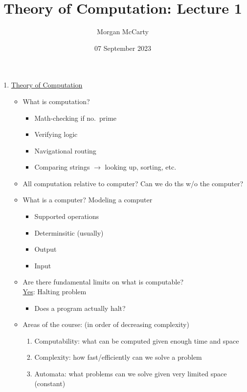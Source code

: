 \documentclass[12pt]{article}
\title{
    Theory of Computation: Lecture 1}
\author{Morgan McCarty}
\date{07 September 2023}
\begin{document}
    \maketitle

    \begin{enumerate}
        \item \underline{Theory of Computation}
        \begin{itemize}
            \item What is computation?
            \begin{itemize}
                \item Math-checking if no.\ prime
                \item Verifying logic
                \item Navigational routing
                \item Comparing strings $\rightarrow$ looking up, sorting, etc.\ 
            \end{itemize}
            \item All computation relative to computer? Can we do ths w/o the computer?
            \item What is a computer? Modeling a computer
            \begin{itemize}
                \item Supported operations
                \item Determinsitic (usually)
                \item Output
                \item Input
            \end{itemize}
            \item Are there fundamental limits on what is computable? \\
                \underline{Yes}: Halting problem
            \begin{itemize}
                \item Does a program actually halt?
            \end{itemize}
            \item Areas of the course: (in order of decreasing complexity)
            \begin{enumerate}
                \item Computability: what can be computed given enough time and space
                \item Complexity: how fast/efficiently can we solve a problem
                \item Automata: what problems can we solve given very limited space (constant)

\end{enumerate}
\end{itemize}
\end{enumerate}
\end{document}

